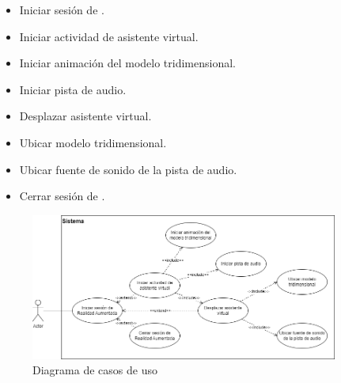 \documentclass{subfiles}
\begin{document}
        \begin{itemize}
            \item Iniciar sesión de \ra.
            \item Iniciar actividad de asistente virtual.
            \item Iniciar animación del modelo tridimensional.
            \item Iniciar pista de audio.
            \item Desplazar asistente virtual.
            \item Ubicar modelo tridimensional.
            \item Ubicar fuente de sonido de la pista de audio.
            \item Cerrar sesión de \ra.
        \end{itemize}

\begin{figure}[ht]
\centering
\includegraphics[width=0.9\textwidth]{img/analisis_casos_de_uso.png}
\caption{Diagrama de casos de uso}
\label{fig:analisis_casos_de_uso}
\end{figure}

\end{document}
